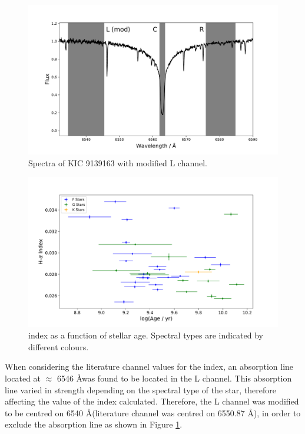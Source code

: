 \begin{figure}
    \centering
    \includegraphics[scale=0.55]{Figures/4-Chromospheric_age/halpha_modified_channels.pdf}
    \caption[Spectra of KIC 9139163 with modified \Halpha channels]{Spectra of KIC 9139163 with modified \Halpha L channel.}
    \label{fig:modified_halpha_channels}
\end{figure}

\begin{figure}
    \centering
    \includegraphics[scale=0.55]{Figures/4-Chromospheric_age/all_data_mod_Halpha_index.pdf}
    \caption[\Halpha index as a function of stellar age]{\Halpha index as a function of stellar age. Spectral types are indicated by different colours.}
    \label{fig:mod_halpha_index_v_age}
\end{figure}

When considering the literature channel values for the \Halpha index, an absorption line located at $\approx$ 6546 \AA \space was found to be located in the L channel. This absorption line varied in strength depending on the spectral type of the star, therefore affecting the value of the \Halpha index calculated. Therefore, the L channel was modified to be centred on 6540 \AA \space (literature channel was centred on 6550.87 \AA), in order to exclude the absorption line as shown in Figure \ref{fig:modified_halpha_channels}. 

